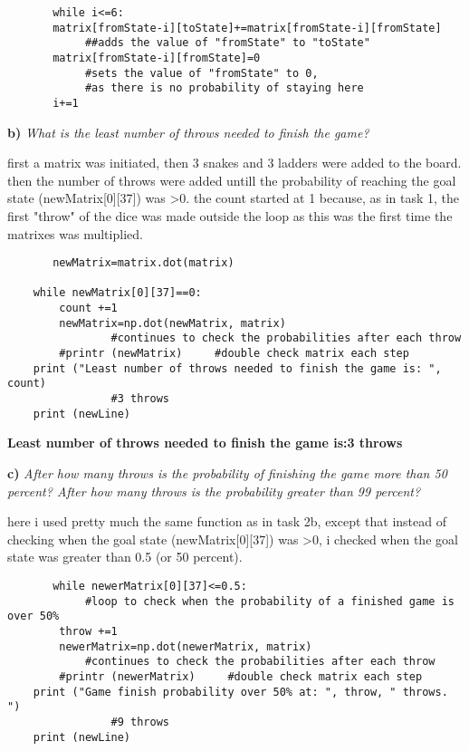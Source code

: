 \documentclass{article}
\begin{document}
\begin{verbatim}
       while i<=6:
       matrix[fromState-i][toState]+=matrix[fromState-i][fromState]      
            ##adds the value of "fromState" to "toState"
       matrix[fromState-i][fromState]=0            
            #sets the value of "fromState" to 0, 
            #as there is no probability of staying here
       i+=1
\end{verbatim}

\textbf{b)}
\textit{What is the least number of throws needed to finish the game?}
\vspace{10pt}

first a matrix was initiated, then 3 snakes and 3 ladders were added to the board. then the number of throws were added untill the probability of reaching the goal state (newMatrix[0][37]) was >0. the count started at 1 because, as in task 1, the first "throw" of the dice was made outside the loop as this was the first time the matrixes was multiplied.

\begin{verbatim}
       newMatrix=matrix.dot(matrix) 

    while newMatrix[0][37]==0:
        count +=1
        newMatrix=np.dot(newMatrix, matrix)     
                #continues to check the probabilities after each throw
        #printr (newMatrix)     #double check matrix each step
    print ("Least number of throws needed to finish the game is: ", count)      
                #3 throws
    print (newLine) 
\end{verbatim}

\textbf{Least number of throws needed to finish the game is:3 throws}

\textbf{c)}
\textit{After how many throws is the probability of finishing the game more
than 50 percent? After how many throws is the probability greater than 99 percent?}

here i used pretty much the same function as in task 2b, except that instead of checking when the goal state (newMatrix[0][37]) was >0, i checked when the goal state was greater than 0.5 (or 50 percent). 

\begin{verbatim}
       while newerMatrix[0][37]<=0.5:       
            #loop to check when the probability of a finished game is over 50%
        throw +=1
        newerMatrix=np.dot(newerMatrix, matrix)      
            #continues to check the probabilities after each throw
        #printr (newerMatrix)     #double check matrix each step
    print ("Game finish probability over 50% at: ", throw, " throws. ")   
                #9 throws
    print (newLine)
\end{verbatim}
\end{document}
